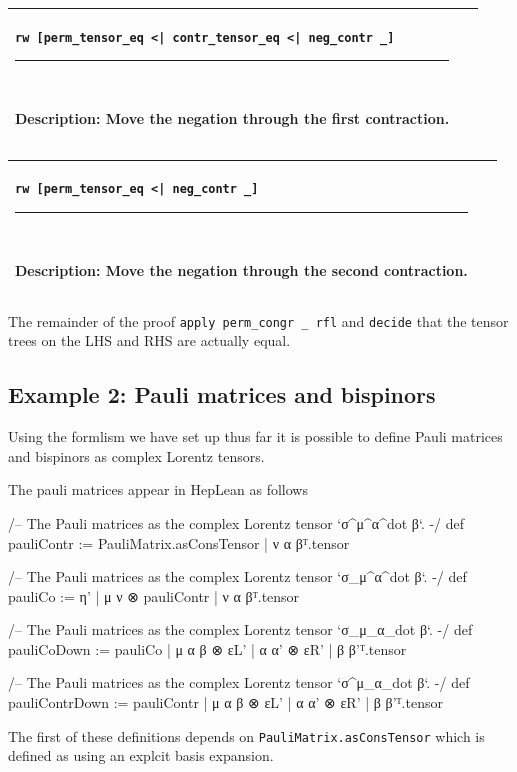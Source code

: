 \documentclass[a4paper, 11pt]{article}
\newcommand{\proofstep}[3]{
  \arrayrulecolor{mycolor}
\begin{center}
\begin{tabular}{|p{3in}| p{3in}|}
\hline
{#1
}\newline 
\hrule~\newline
#2
  & ~\newline
\makebox[3in]{%
#3}
  \\ \hline
\end{tabular}
\end{center}
\arrayrulecolor{black}
}
\begin{document}
\proofstep{\lstinline!rw [perm_tensor_eq <| contr_tensor_eq <| neg_contr _]!}{
  Description: Move the negation through the first contraction.
}{
  \begin{tikzpicture}
    \node[draw=black] (A) at (0,0) {perm};
    \node[draw=black] (B) at (0,-1) {contr 0 0};
    \node[draw=red] (C) at (0,-2) {neg};
    \node[draw=red] (D) at (0,-3) {contr 0 1};
    \node[draw=black] (E) at (0,-4) {prod};
    \node[draw=black] (F1) at (-1,-5) {A};
    \node[draw=black] (F2) at (1,-5) {S};
    \path [->] (A) edge (B);
    \path [->] (B) edge (C);
    \path [->, color = red] (C) edge (D);
    \path [->, color = red] (D) edge (E);
    \path [->] (E) edge (F1);
    \path [->] (E) edge (F2);
  \end{tikzpicture}
}

\proofstep{\lstinline!rw [perm_tensor_eq <| neg_contr _]!}{
  Description: Move the negation through the second contraction.
}{
  \begin{tikzpicture}
    \node[draw=black] (A) at (0,0) {perm};
    \node[draw=red] (B) at (0,-1) {neg};
    \node[draw=red] (C) at (0,-2) {contr 0 0};
    \node[draw=black] (D) at (0,-3) {contr 0 1};
    \node[draw=black] (E) at (0,-4) {prod};
    \node[draw=black] (F1) at (-1,-5) {A};
    \node[draw=black] (F2) at (1,-5) {S};
    \path [->] (A) edge (B);
    \path [->, color = red] (B) edge (C);
    \path [->, color = red] (C) edge (D);
    \path [->] (D) edge (E);
    \path [->] (E) edge (F1);
    \path [->] (E) edge (F2);
  \end{tikzpicture}
}

The remainder of the proof \lstinline|apply perm_congr _ rfl| and \lstinline|decide| that the 
tensor trees on the LHS and RHS are actually equal.
\subsection{Example 2: Pauli matrices and bispinors}

Using the formlism we have set up thus far it is possible to define Pauli matrices and bispinors 
as complex Lorentz tensors.
 
The pauli matrices appear in HepLean as follows 
\begin{code}
/-- The Pauli matrices as the complex Lorentz tensor `σ^μ^α^{dot β}`. -/
def pauliContr := {PauliMatrix.asConsTensor | ν α β}ᵀ.tensor

/-- The Pauli matrices as the complex Lorentz tensor `σ_μ^α^{dot β}`. -/
def pauliCo := {η' | μ ν ⊗ pauliContr | ν α β}ᵀ.tensor

/-- The Pauli matrices as the complex Lorentz tensor `σ_μ_α_{dot β}`. -/
def pauliCoDown := {pauliCo | μ α β ⊗ εL' | α α' ⊗ εR' | β β'}ᵀ.tensor

/-- The Pauli matrices as the complex Lorentz tensor `σ^μ_α_{dot β}`. -/
def pauliContrDown := {pauliContr | μ α β ⊗ εL' | α α' ⊗ εR' | β β'}ᵀ.tensor
\end{code}
The first of these definitions depends on \lstinline|PauliMatrix.asConsTensor| which is defined as 
using an explcit basis expansion. 
\end{document}
